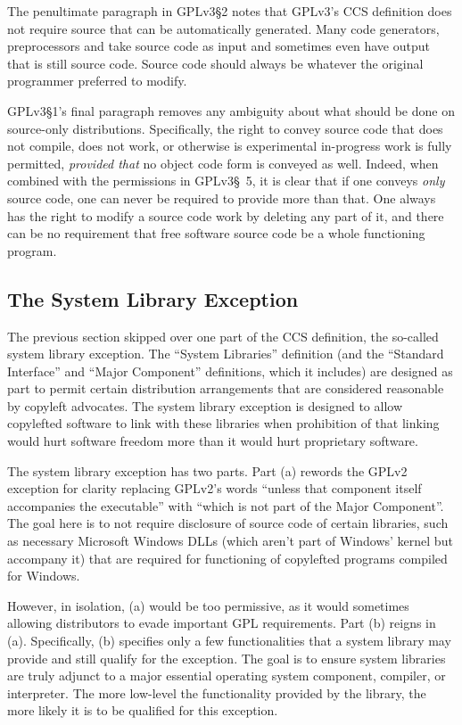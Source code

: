 The penultimate paragraph in GPLv3\S2 notes that GPLv3's CCS definition does
not require source that can be automatically generated.  Many code
generators, preprocessors and take source code as input and sometimes even
have output that is still source code.  Source code should always be whatever
the original programmer preferred to modify.

GPLv3\S1's final paragraph removes any ambiguity about what should be done on
source-only distributions.  Specifically, the right to convey source code
that does not compile, does not work, or otherwise is experimental
in-progress work is fully permitted, \textit{provided that} no object code
form is conveyed as well.  Indeed, when combined with the permissions in
GPLv3\S~5, it is clear that if one conveys \textit{only} source code, one can
never be required to provide more than that.  One always has the right to
modify a source code work by deleting any part of it, and there can be no
requirement that free software source code be a whole functioning program.

\subsection{The System Library Exception}

The previous section skipped over one part of the CCS definition, the
so-called system library exception.  The ``System Libraries'' definition (and
the ``Standard Interface'' and ``Major Component'' definitions, which it
includes) are designed as part
to permit certain distribution arrangements that are considered reasonable by
copyleft advocates.  The system library exception is designed to allow
copylefted software to link with these libraries when prohibition of that linking would hurt
software freedom more than it would hurt proprietary software.

The system library exception has two parts.  Part (a) rewords the GPLv2
exception for clarity replacing GPLv2's words ``unless that component itself
accompanies the executable'' with ``which is not part of the Major
Component''.  The goal here is to not require disclosure of source code of
certain libraries, such as necessary Microsoft Windows DLLs (which aren't
part of Windows' kernel but accompany it) that are required for functioning
of copylefted programs compiled for Windows.

However, in isolation, (a) would be too permissive, as it would sometimes
allowing distributors to evade important GPL requirements.  Part (b) reigns
in (a).  Specifically, (b) specifies only a few functionalities that a
system library may provide and still qualify for the exception.  The goal is
to ensure system libraries are truly adjunct to a major essential operating
system component, compiler, or interpreter.  The more low-level the
functionality provided by the library, the more likely it is to be qualified
for this exception.


